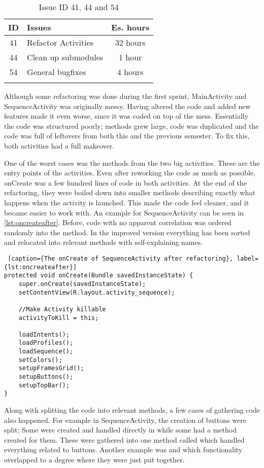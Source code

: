 \begin{longtable} { | c | p{12cm} | c | } 
\hline
	ID 	&	Issues	&		 Es. hours \\\hline
	41	&	Refactor Activities	&	32 hours	\\\hline
	44	&	Clean up submodules &	1 hour	\\\hline
	54	&	General bugfixes	&	4 hours \\\hline
\caption{Issue ID 41, 44 and 54}
\label{tab:spr4_refactoroverview}
\end{longtable}

Although some refactoring was done during the first sprint, MainActivity and SequenceActivity was originally messy. Having altered the code and added new features made it even worse, since it was coded on top of the mess. Essentially the code was structured poorly; methods grew large, code was duplicated and the code was full of leftovers from both this and the previous semester. To fix this, both activities had a full makeover.

One of the worst cases was the  methods from the two big activities. These are the entry points of the activities. Even after reworking the code as much as possible, onCreate was a few hundred lines of code in both activities. At the end of the refactoring, they were boiled down into smaller methods describing exactly what happens when the activity is launched. This made the code feel cleaner, and it became easier to work with. An example for SequenceActivity can be seen in \ref{lst:oncreateafter}. Before, code with no apparent correlation was ordered randomly into the  method. In the improved version everything has been sorted and relocated into relevant methods with self-explaining names.

\begin{lstlisting} [caption={The onCreate of SequenceActivity after refactoring}, label={lst:oncreateafter}]
protected void onCreate(Bundle savedInstanceState) {
    super.onCreate(savedInstanceState);
    setContentView(R.layout.activity_sequence);
	
    //Make Activity killable
    activityToKill = this;

    loadIntents();
    loadProfiles();
    loadSequence();
    setColors();
    setupFramesGrid();
    setupButtons();
    setupTopBar();
}
\end{lstlisting}

Along with splitting the code into relevant methods, a few cases of gathering code also happened. For example in SequenceActivity, the creation of buttons were split; Some were created and handled directly in  while some had a method created for them. These were gathered into one method called  which handled everything related to buttons. Another example was  and  which functionality overlapped to a degree where they were just put together.

